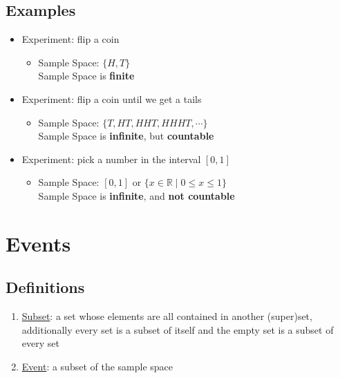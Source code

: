 \documentclass[12pt]{article}
\begin{document}
        \subsection{Examples}
            \begin{itemize}
                \item Experiment: flip a coin
                    \begin{itemize}
                        \item Sample Space: $\{H, T\}$
                        \\Sample Space is \textbf{finite}
                    \end{itemize}
                \item Experiment: flip a coin until we get a tails
                    \begin{itemize}
                        \item Sample Space: $\{T, HT, HHT, HHHT, \cdots\}$
                        \\Sample Space is \textbf{infinite}, but \textbf{countable}
                    \end{itemize}
                \item Experiment: pick a number in the interval $[0, 1]$
                    \begin{itemize}
                        \item Sample Space: $[0, 1]$ or $\{ x \in \mathbb{R} \mid 0 \leq x \leq 1 \}$
                        \\Sample Space is \textbf{infinite}, and \textbf{not countable}
                    \end{itemize}
            \end{itemize}
        
    \section{Events}
        \subsection{Definitions}
            \begin{enumerate}
                \item \underline{Subset}: a set whose elements are all contained in another (super)set, additionally every set is a subset of itself and the empty set is a subset of every set
                \item \underline{Event}: a subset of the sample space
    
            \end{enumerate}
\end{document}
